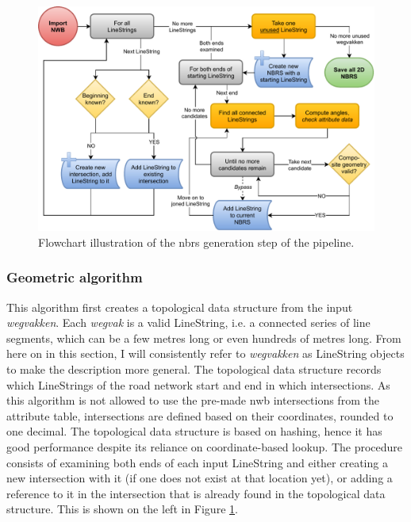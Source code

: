 \begin{figure}
    \centering
    \includegraphics[width=\linewidth]{final_report/figs/nbrs_generation.pdf}
    \caption[Flowchart illustrating of the NBRS generation step]{Flowchart illustration of the \ac{nbrs} generation step of the pipeline.}
    \label{fig:nbrsgenerationflow}
\end{figure}

\subsubsection{Geometric algorithm}

This algorithm first creates a topological data structure from the input \textit{wegvakken}. Each \textit{wegvak} is a valid LineString, i.e. a connected series of line segments, which can be a few metres long or even hundreds of metres long. From here on in this section, I will consistently refer to \textit{wegvakken} as LineString objects to make the description more general. The topological data structure records which LineStrings of the road network start and end in which intersections. As this algorithm is not allowed to use the pre-made \ac{nwb} intersections from the attribute table, intersections are defined based on their coordinates, rounded to one decimal. The topological data structure is based on hashing, hence it has good performance despite its reliance on coordinate-based lookup. The procedure consists of examining both ends of each input LineString and either creating a new intersection with it (if one does not exist at that location yet), or adding a reference to it in the intersection that is already found in the topological data structure. This is shown on the left in Figure \ref{fig:nbrsgenerationflow}.

